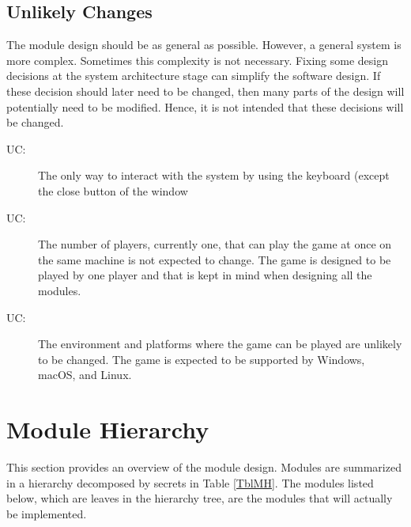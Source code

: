 \documentclass[12pt, titlepage]{article}
\newcounter{ucnum}
\newcommand{\uctheucnum}{UC\theucnum}
\begin{document}
\subsection{Unlikely Changes} \label{SecUchange}

The module design should be as general as possible. However, a general system is
more complex. Sometimes this complexity is not necessary. Fixing some design
decisions at the system architecture stage can simplify the software design. If
these decision should later need to be changed, then many parts of the design
will potentially need to be modified. Hence, it is not intended that these
decisions will be changed.

\begin{description}
\item[ \uctheucnum \label{ucIO}:] The only way to interact with the system by using the keyboard (except the close button of the window \color{red}{and setting menu}\color{black}{). The user must use the keyboard to control the character during the game. The keyboard is also needed to navigate through the main, pause, and end menu. This includes the settings menu as well, which is accessed through the main menu.}
\item[ \uctheucnum \label{ucInput}:] The number of players, currently one, that can play the game at once on the same machine is not expected to change. The game is designed to be played by one player and that is kept in mind when designing all the modules.
\item[ \uctheucnum \label{ucInput}:] The environment and platforms where the game can be played are unlikely to be changed. The game is expected to be supported by Windows, macOS, and Linux. 
\end{description}


\section{Module Hierarchy} \label{SecMH}

This section provides an overview of the module design. Modules are summarized
in a hierarchy decomposed by secrets in Table \ref{TblMH}. The modules listed
below, which are leaves in the hierarchy tree, are the modules that will
actually be implemented.
\end{document}
